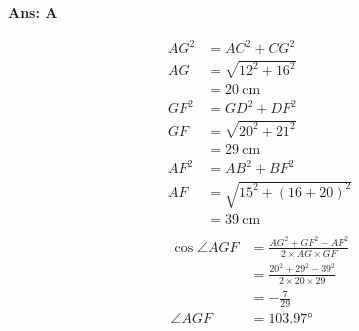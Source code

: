 \documentclass[border=3pt,varwidth=70mm]{standalone}
\begin{document}
\begin{answer}
\hrulefill\par
\textbf{Ans: A}

\begin{equation*}
\begin{aligned}
AG^2 &= AC^2 + CG^2 \\
AG   &= \sqrt{12^2+16^2} \\
	 &= \SI{20}{\centi\meter} \\
GF^2 &= GD^2 + DF^2 \\
GF   &= \sqrt{20^2+21^2} \\
	 &= \SI{29}{\centi\meter} \\
AF^2 &= AB^2 + BF^2 \\
AF   &= \sqrt{15^2+(16+20)^2} \\
	 &= \SI{39}{\centi\meter} \\
\end{aligned}
\end{equation*}
\begin{equation*}
\begin{aligned}
\cos\angle AGF &= \frac{AG^2 + GF^2 - AF^2}{2\times AG\times GF} \\
			   &= \frac{20^2 + 29^2 - 39^2}{2\times 20\times 29} \\	
			   &= -\frac{7}{29} \\
\angle AGF     &= \ang{103.97} \\
\end{aligned}
\end{equation*}

\end{answer}
\end{document}
